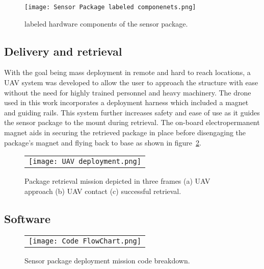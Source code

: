 \documentclass[]{spie}  %
\begin{document}
	\begin{figure} [H]
	\centering
	\texttt{[image: Sensor Package labeled componenets.png]}
	\caption{labeled hardware components of the sensor package. }
	\label{fig:Sensor_Package_labeled_componenets}
	\end{figure}
	
		\subsection{Delivery and retrieval}
	
	With the goal being mass deployment in remote and hard to reach locations, a UAV system was developed to allow the user to approach the structure with ease without the need for highly trained personnel and heavy machinery. The drone used in this work incorporates a deployment harness which included a magnet  and guiding rails. This system further increases safety and ease of use as it guides the sensor package to the mount during retrieval. The on-board electropermanent magnet aids in securing the retrieved package in place before disengaging the package’s magnet and flying back to base as shown in figure~\ref{fig:UAV_deployment}\cite{Carroll2021}.
	
	\begin{figure} [H]
		\begin{center}
			\begin{tabular}{c} 
				\texttt{[image: UAV deployment.png]}
			\end{tabular}
		\end{center}
		\caption[example] 
		{ \label{fig:UAV_deployment} 
			Package retrieval mission depicted in three frames (a) UAV approach (b) UAV contact (c) successful retrieval.}
	\end{figure} 

	
		\subsection{Software}
	
	\begin{figure} [H]
		\begin{center}
			\begin{tabular}{c} 
				\texttt{[image: Code FlowChart.png]}
			\end{tabular}
		\end{center}
		\caption[example] 
		{ \label{fig:Code FlowChart} 
			Sensor package deployment mission code breakdown. }
	\end{figure}
	
\end{document}
